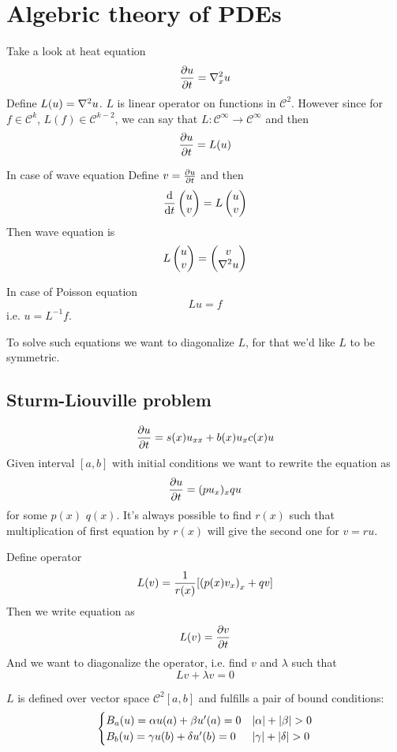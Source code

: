 \section{Algebric theory of PDEs}
Take a look at heat equation
$$\pdv{u}{t} = \laplacian_x u$$
Define $L(u) = \laplacian u$. $L$ is linear operator on functions in $\mathcal{C}^2$. However since for $f\in \mathcal{C}^k$, $L(f) \in \mathcal{C}^{k-2}$, we can say that $L: \mathcal{C}^\infty \to \mathcal{C}^\infty$ and then
$$\pdv{u}{t}  =L(u)$$

In case of wave equation
Define $v=\pdv{u}{t}$ and then
$$\dv{t} \begin{pmatrix}u\\v\end{pmatrix} = L \begin{pmatrix}u\\v\end{pmatrix}$$
Then wave equation is
$$ L \begin{pmatrix}u\\v\end{pmatrix}=  \begin{pmatrix}v\\\laplacian{u}\end{pmatrix} $$

In case of Poisson equation
$$Lu = f$$
i.e.
$u=L^{-1}f$.

To solve such equations we want to diagonalize $L$, for that we'd like $L$ to be symmetric.
\subsection{Sturm-Liouville problem }
$$\pdv{u}{t} = s(x) u_{xx} + b(x) u_x c(x) u$$
Given interval $[a,b]$ with initial conditions we want to rewrite the equation as
$$\pdv{u}{t} = (pu_x)_x qu$$
for some $p(x)$ $q(x)$. It's always possible to find  $r(x)$ such that multiplication of first equation by $r(x)$ will give the second one for $v=ru$. 

Define operator
$$L(v) = \frac{1}{r(x)}[\qty(p(x) v_x)_x + qv]$$
Then we write equation as
$$L(v) = \pdv{v}{t}$$
And we want to diagonalize the operator, i.e. find $v$ and $\lambda$ such that
$$Lv + \lambda v = 0$$

$L$ is defined over vector space $\mathcal{C}^2[a,b]$ and fulfills a pair of bound conditions:
$$\begin{cases}
B_a(u) = \alpha u(a) + \beta u'(a) = 0& \abs{\alpha} + \abs{\beta}>0\\
B_b(u)  = \gamma u(b) + \delta u'(b) = 0& \abs{\gamma} + \abs{\delta}>0
\end{cases}$$

